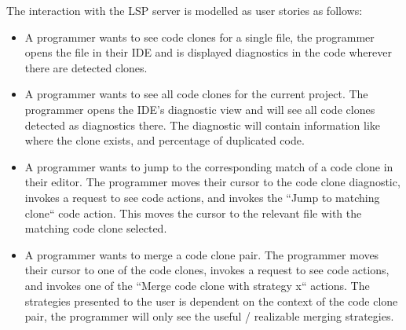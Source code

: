 \documentclass[12pt]{article}
\begin{document}
The interaction with the LSP server is modelled as user stories as follows:

\begin{itemize} 
    \item A programmer wants to see code clones for a single file, the
        programmer opens the file in their IDE and is displayed diagnostics in the code
        wherever there are detected clones.

    \item A programmer wants to see all code clones for the current project. The
        programmer opens the IDE's diagnostic view and will see all code clones detected
        as diagnostics there. The diagnostic will contain information like where the clone
        exists, and percentage of duplicated code.

    \item A programmer wants to jump to the corresponding match of a code clone in their
        editor. The programmer moves their cursor to the code clone diagnostic, invokes a
        request to see code actions, and invokes the ``Jump to matching clone`` code
        action. This moves the cursor to the relevant file with the matching code clone
        selected.

    \item A programmer wants to merge a code clone pair. The programmer moves their cursor
        to one of the code clones, invokes a request to see code actions, and invokes one
        of the ``Merge code clone with strategy x`` actions. The strategies presented to
        the user is dependent on the context of the code clone pair, the programmer will
        only see the useful / realizable merging strategies.
\end{itemize}






\end{document}
